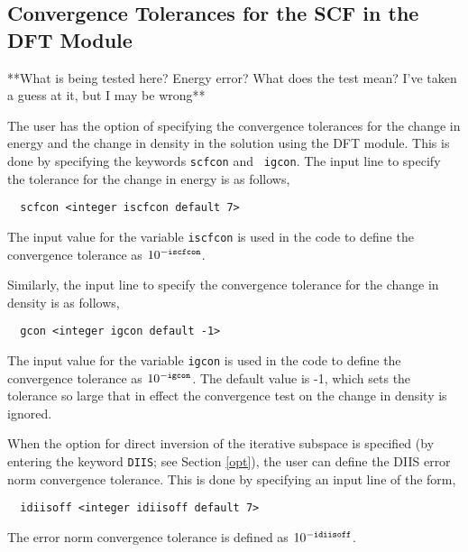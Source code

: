 \subsection{Convergence Tolerances for the SCF in the DFT Module}

\Large
**What is being tested here?  Energy error?  What does the test mean?
I've taken a guess at it, but I may be wrong**
\normalsize

The user has the option of specifying the convergence tolerances for the
change in energy and the change in density in the solution using the DFT
module.  This is done by specifying the keywords {\tt scfcon} and {\tt 
igcon}.  The input line to specify the tolerance for the change in
energy is as follows,

\begin{verbatim}
  scfcon <integer iscfcon default 7>
\end{verbatim}

The input value for the variable \verb+iscfcon+ is used in the code to
define the convergence tolerance as $10^{-{\tt iscfcon}}$.

Similarly, the input line to specify the convergence tolerance for the 
change in density is as follows,

\begin{verbatim}
  gcon <integer igcon default -1>
\end{verbatim}

The input value for the variable \verb+igcon+ is used in the code to
define the convergence tolerance as $10^{-{\tt igcon}}$.  The default
value is -1, which sets the tolerance so large that in effect the 
convergence test on the change in density is ignored.

When the option for direct inversion of the iterative subspace is
specified (by entering the keyword \verb+DIIS+; see Section \ref{opt}),
the user can define the DIIS error norm convergence tolerance.  This
is done by specifying an input line of the form,

\begin{verbatim}
  idiisoff <integer idiisoff default 7>
\end{verbatim}

The error norm convergence tolerance is defined as $10^{-{\tt idiisoff}}$.



